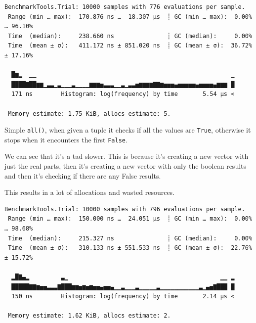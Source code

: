 \documentclass[
  8pt,
  a4paper,
]{book}
\newenvironment{Shaded}{\begin{snugshade}}{\end{snugshade}}
\newcommand{\FloatTok}[1]{\textcolor[rgb]{0.68,0.00,0.00}{#1}}
\newcommand{\FunctionTok}[1]{\textcolor[rgb]{0.28,0.35,0.67}{#1}}
\newcommand{\NormalTok}[1]{\textcolor[rgb]{0.00,0.23,0.31}{#1}}
\newcommand{\OperatorTok}[1]{\textcolor[rgb]{0.37,0.37,0.37}{#1}}
\newcommand{\PreprocessorTok}[1]{\textcolor[rgb]{0.68,0.00,0.00}{#1}}
\begin{document}
\begin{Shaded}
\end{Shaded}

\begin{verbatim}
BenchmarkTools.Trial: 10000 samples with 776 evaluations per sample.
 Range (min … max):  170.876 ns …  18.307 μs  ┊ GC (min … max):  0.00% … 96.10%
 Time  (median):     238.660 ns               ┊ GC (median):     0.00%
 Time  (mean ± σ):   411.172 ns ± 851.020 ns  ┊ GC (mean ± σ):  36.72% ± 17.16%

  █▆▂  ▁▁                                                       ▁
  ████▇██▆▆▁▃▃▁▃▁▁▁▃▁▁▁▁▆▆▆▅▃▃▃▁▁▃▁▃▃▅▆▆▆▆▇▇▆▅▅▅▄▅▅▅▅▅▄▅▅▅▅▄▆▆▆ █
  171 ns        Histogram: log(frequency) by time       5.54 μs <

 Memory estimate: 1.75 KiB, allocs estimate: 5.
\end{verbatim}

Simple \texttt{all()}, when given a tuple it checks if all the values
are \texttt{True}, otherwise it stops when it encounters the first
\texttt{False}.

We can see that it's a tad slower. This is because it's creating a new
vector with just the real parts, then it's creating a new vector with
only the boolean results and then it's checking if there are any False
results.

This results in a lot of allocations and wasted resources.

\begin{Shaded}
\end{Shaded}

\begin{verbatim}
BenchmarkTools.Trial: 10000 samples with 796 evaluations per sample.
 Range (min … max):  150.000 ns …  24.051 μs  ┊ GC (min … max):  0.00% … 98.68%
 Time  (median):     215.327 ns               ┊ GC (median):     0.00%
 Time  (mean ± σ):   310.133 ns ± 551.533 ns  ┊ GC (mean ± σ):  22.76% ± 15.72%

  ▂█▇▄▂         ▃▁                                           ▁▁ ▂
  █████▇▇▆▅▅▃▃▃▇███▆▆▅▆▅▆▅▅▄▅▅▄▁▁▃▁▁▁▃▁▁▁▁▁▃▁▁▁▁▁▁▁▁▁▁▁▃▁▄▅▇███ █
  150 ns        Histogram: log(frequency) by time       2.14 μs <

 Memory estimate: 1.62 KiB, allocs estimate: 2.
\end{verbatim}
\end{document}
